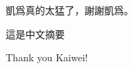 \NTUtitlepage  %

\newpage
\setcounter{page}{1}

\NTUoralpage  %

\mydoublespacing
\begin{acknowledgement} %
    凱爲真的太猛了，謝謝凱爲。

\end{acknowledgement}

\begin{zhAbstract} %
    這是中文摘要
\end{zhAbstract}

\begin{enAbstract} %
    Thank you Kaiwei!
\end{enAbstract}

{
\mysinglespacing\selectfont
\tableofcontents %

\listoffigures  %

\listoftables  %
\par
}

\newpage
\setcounter{page}{1}
